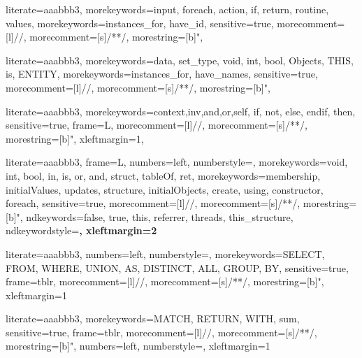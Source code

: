 
{
literate={aaa}{bbb}3,
morekeywords={input, foreach, action, if, return, routine, values},
morekeywords={instances_for, have_id},
sensitive=true,
morecomment=[l]{//},
morecomment=[s]{/*}{*/},
morestring=[b]",
}

{
literate={aaa}{bbb}3,
morekeywords={data, set_type, void, int, bool, Objects, THIS, is, ENTITY},
morekeywords={instances_for, have_names},
sensitive=true,
morecomment=[l]{//},
morecomment=[s]{/*}{*/},
morestring=[b]",
}

{
literate={aaa}{bbb}3,
morekeywords={context,inv,and,or,self, if, not, else, endif, then},
sensitive=true,
frame=L,
morecomment=[l]{//},
morecomment=[s]{/*}{*/},
morestring=[b]",
xleftmargin=1\parindent,
}

{
literate={aaa}{bbb}3,
frame=L, %
numbers=left,
numberstyle=\color{black}\scriptsize,
morekeywords={void, int, bool, in, is, or, and, struct, tableOf, ret},
morekeywords={membership, initialValues, updates, structure, initialObjects, create, using, constructor, foreach},
sensitive=true,
morecomment=[l]{//},
morecomment=[s]{/*}{*/},
morestring=[b]",
ndkeywords={false, true, this, referrer, threads, this_structure},
ndkeywordstyle=\color{blue}\bfseries,
xleftmargin=2\parindent
}

{
literate={aaa}{bbb}3,
numbers=left,
numberstyle=\color{black}\scriptsize,
morekeywords={SELECT, FROM, WHERE, UNION, AS, DISTINCT, ALL, GROUP, BY},
sensitive=true,
frame=tblr,
morecomment=[l]{//},
morecomment=[s]{/*}{*/},
morestring=[b]",
xleftmargin=1\parindent
}

{
literate={aaa}{bbb}3,
morekeywords={MATCH, RETURN, WITH, sum},
sensitive=true,
frame=tblr,
morecomment=[l]{//},
morecomment=[s]{/*}{*/},
morestring=[b]",
numbers=left,
numberstyle=\color{black}\scriptsize,
xleftmargin=1\parindent
}

